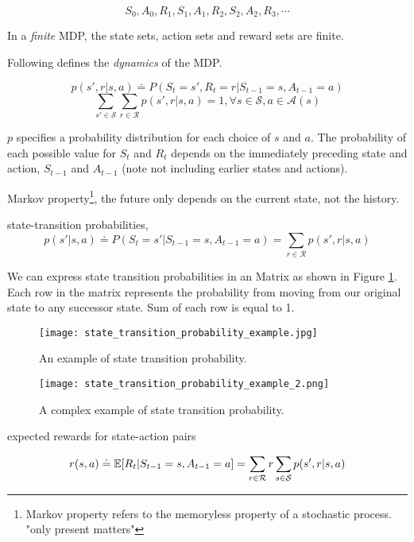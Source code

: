 \documentclass[sutton_barto_notes.tex]{subfiles}
\begin{document}
$$ S_0, A_0, R_1, S_1, A_1, R_2, S_2, A_2, R_3, \cdots $$

In a \textit{finite} MDP, the state sets, action sets and reward sets are finite.

Following defines the \textit{dynamics} of the MDP.

$$ p(s', r| s, a) \doteq P(S_t = s', R_t = r | S_{t-1} = s, A_{t-1} = a) $$
$$ \sum_{s' \in \mathcal{S}} \sum_{r \in \mathcal{R}} p(s',r|s,a) = 1, \forall s \in \mathcal{S}, a \in \mathcal{A}(s) $$

$p$ specifies a probability distribution for each choice of $s$ and $a$.
The probability of each possible value for $S_t$ and $R_t$ depends on the immediately preceding state and action, $S_{t-1}$ and $A_{t-1}$ (note not including earlier states and actions).

\begin{definition}
Markov property\footnote{Markov property refers to the memoryless property of a stochastic process. "only present matters"}, the future only depends on the current state, not the history.
\end{definition}

\begin{definition}
state-transition probabilities,
$$ p(s'|s,a) \doteq P(S_t=s'|S_{t-1}=s, A_{t-1}=a) = \sum_{r\in \mathcal{R}} p(s',r|s,a) $$
\end{definition}
We can express state transition probabilities in an Matrix as shown in Figure \ref{fig:state-trans-prob-eg}. Each row in the matrix represents the probability from moving from our original state to any successor state. Sum of each row is equal to 1.
\begin{figure}[h!]
  \texttt{[image: state\_transition\_probability\_example.jpg]}
  \caption{An example of state transition probability.}
  \label{fig:state-trans-prob-eg}
\end{figure}

\begin{figure}[h!]
  \texttt{[image: state\_transition\_probability\_example\_2.png]}
  \caption{A complex example of state transition probability.}
  \label{fig:state-trans-prob-eg2}
\end{figure}

\begin{definition}
expected rewards for state-action pairs

$$ r(s,a) \doteq \operatorname*{\mathbb{E}} [R_t | S_{t-1}=s, A_{t-1}=a] = \sum_{r\in \mathcal{R}} r \sum_{s\in \mathcal{S}} p(s',r|s,a) $$
\end{definition}
\end{document}
